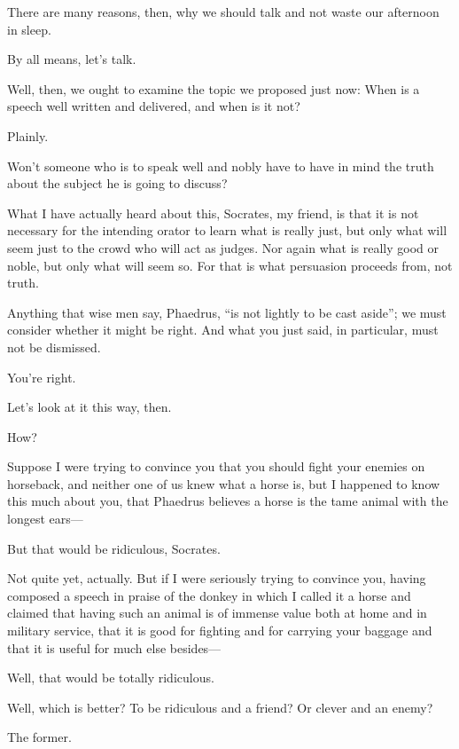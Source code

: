 There are many reasons, then, why we should talk and not waste our
afternoon in sleep.

\sayphaedrus By all means, let's talk.

\saysocrates Well, then, we ought to examine the topic we proposed
just now: When is a speech well written and delivered, and when is it
not?

\sayphaedrus Plainly.

\saysocrates Won't someone who is to speak well and nobly have to have in
mind the truth about the subject he is going to discuss?

\sayphaedrus What I have actually heard about this, Socrates, my friend, 
is that it is not necessary for the intending orator to
learn what is really just, but only what will seem just to the crowd who
will act as judges. Nor again what is really good or noble, but only
what will seem so. For that is what persuasion proceeds from, not truth.

\saysocrates Anything that wise men say, Phaedrus, “is not lightly to be
cast aside”; we must
consider whether it might be right. And what you just said, in
particular, must not be dismissed.

\sayphaedrus You're right.

\saysocrates Let's look at it this way, then.

\sayphaedrus How?

\saysocrates Suppose I were trying to convince you that you should
fight your enemies on horseback, and neither one of us knew what a horse
is, but I happened to know this much about you, that Phaedrus believes a
horse is the tame animal with the longest ears---

\sayphaedrus But that would be ridiculous, Socrates.

\saysocrates Not quite yet, actually. But if I were seriously trying to
convince you, having composed a speech in praise of the donkey in which
I called it a horse and claimed that having such an animal is of immense
value both at home and in military service, that it is good for fighting
and for carrying your baggage and that it is useful for much else
besides---

\sayphaedrus Well, that would be totally ridiculous.

\saysocrates Well, which is better? To be ridiculous and a friend? Or
clever and an enemy?

\sayphaedrus The former.

